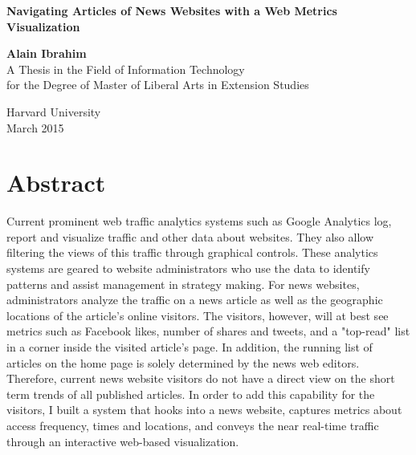 \documentclass[12pt]{article}
\begin{document}

\begin{titlepage}
    \begin{center}
        
        \begin{doublespace}        
        \textbf{\Large Navigating Articles of News Websites with a Web Metrics Visualization}
        \vfill

        \vspace{2in}
        \textbf{\Large Alain Ibrahim} \\
		\vspace{2in}
        A Thesis in the Field of Information Technology \\
        for the Degree of Master of Liberal Arts in Extension Studies \\

        \vspace{.5in} 

        
        Harvard University \\
        \vspace {.4in}
        March 2015        

		\end{doublespace}        
        
        \vfill
         
    \end{center}
\end{titlepage}


\section{Abstract}

Current prominent web traffic analytics systems such as Google Analytics log, report and visualize traffic and other data about websites. They also allow filtering the views of this traffic through graphical controls. These analytics systems are geared to website administrators who use the data to identify patterns and assist management in strategy making. For news websites, administrators analyze the traffic on a news article as well as the geographic locations of the article's online visitors. The visitors, however, will at best see metrics such as Facebook likes, number of shares and tweets, and a "top-read" list in a corner inside the visited article's page. In addition, the running list of articles on the home page is solely determined by the news web editors. Therefore, current news website visitors do not have a direct view on the short term trends of all published articles. In order to add this capability for the visitors, I built a system that hooks into a news website, captures metrics about access frequency, times and locations, and conveys the near real-time traffic through an interactive web-based visualization.
\newpage
\end{document}
